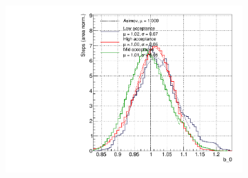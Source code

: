 \begin{figure}[h]
\begin{subfigure}[t]{0.32\textwidth}
	\includegraphics[width=\textwidth, trim={0mm 0mm 0mm 0mm}, clip,page=134]{figures/mach3/Asimov/2017_NewDet_Asimov_actually_0_2017b_NewDet_3Xsec_4Det_5Flux_NewXSecTune_Asimov_0_2017b_NewDet_NewData_Asimov_Long_0}
\end{subfigure}


\end{figure}
